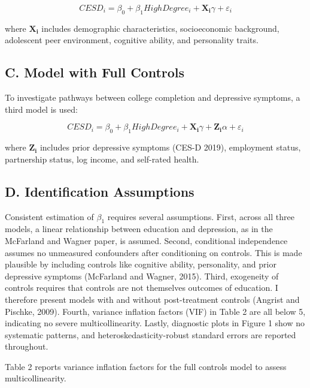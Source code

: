 \documentclass[
  12pt,
]{article}
\begin{document}
\[ CESD_i = \beta_0 + \beta_1 HighDegree_i + \mathbf{X_i}\gamma + \varepsilon_i \]

where \(\mathbf{X_i}\) includes demographic characteristics,
socioeconomic background, adolescent peer environment, cognitive
ability, and personality traits.

\subsection{C. Model with Full
Controls}\label{c.-model-with-full-controls}

To investigate pathways between college completion and depressive
symptoms, a third model is used:

\[ CESD_i = \beta_0 + \beta_1 HighDegree_i + \mathbf{X_i}\gamma + \mathbf{Z_i}\alpha + \varepsilon_i \]

where \(\mathbf{Z_i}\) includes prior depressive symptoms (CES-D 2019),
employment status, partnership status, log income, and self-rated
health.

\subsection{D. Identification
Assumptions}\label{d.-identification-assumptions}

Consistent estimation of \(\beta_1\) requires several assumptions.
First, across all three models, a linear relationship between education
and depression, as in the McFarland and Wagner paper, is assumed.
Second, conditional independence assumes no unmeasured confounders after
conditioning on controls. This is made plausible by including controls
like cognitive ability, personality, and prior depressive symptoms
(McFarland and Wagner, 2015). Third, exogeneity of controls requires
that controls are not themselves outcomes of education. I therefore
present models with and without post-treatment controls (Angrist and
Pischke, 2009). Fourth, variance inflation factors (VIF) in Table 2 are
all below 5, indicating no severe multicollinearity. Lastly, diagnostic
plots in Figure 1 show no systematic patterns, and
heteroskedasticity-robust standard errors are reported throughout.

Table 2 reports variance inflation factors for the full controls model
to assess multicollinearity.
\end{document}
